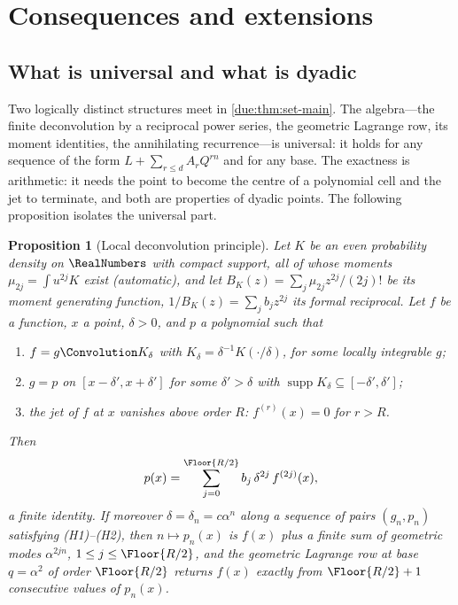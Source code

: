 \documentclass[11pt,oneside]{article}
\theoremstyle{plain}
\newtheorem{proposition}[theorem]{Proposition}
\theoremstyle{definition}
\theoremstyle{remark}
\newcommand{\Qq}{Q}                                         %
\begin{document}
\section{Consequences and extensions}
\label{due:sec:consequences}

\subsection{What is universal and what is dyadic}
\label{due:sec:cons-universal}

Two logically distinct structures meet in \cref{due:thm:set-main}.  The
algebra---the finite deconvolution by a reciprocal power series, the
geometric Lagrange row, its moment identities, the annihilating
recurrence---is universal: it holds for any sequence of the form
$L+\sum_{r\le d}A_{r}\Qq^{rn}$ and for any base.  The exactness is
arithmetic: it needs the point to become the centre of a polynomial cell
and the jet to terminate, and both are properties of dyadic points.  The
following proposition isolates the universal part.

\begin{proposition}[Local deconvolution principle]
\label{due:prop:cons-principle}
Let $K$ be an even probability density on $\RealNumbers$ with compact
support, all of whose moments $\mu_{2j}=\int u^{2j}K$ exist (automatic),
and let $B_{K}(z)=\sum_{j}\mu_{2j}z^{2j}/(2j)!$ be its moment generating
function, $1/B_{K}(z)=\sum_{j}b_{j}z^{2j}$ its formal reciprocal.  Let
$f$ be a function, $x$ a point, $\delta>0$, and $p$ a polynomial such that
\begin{enumerate}[label=\textup{(H\arabic*)}]
\item $f=g\Convolution K_{\delta}$ with $K_{\delta}=\delta^{-1}K(\cdot/\delta)$,
 for some locally integrable $g$;
\item $g=p$ on $[x-\delta',x+\delta']$ for some $\delta'>\delta$ with
 $\operatorname{supp}K_{\delta}\subseteq[-\delta',\delta']$;
\item the jet of $f$ at $x$ vanishes above order $R$: $f^{(r)}(x)=0$ for
 $r>R$.
\end{enumerate}
Then
\begin{equation}
 p(x)=\sum_{j=0}^{\Floor{R/2}}b_{j}\,\delta^{2j}\,f^{(2j)}(x),
 \label{due:eq:cons-principle}
\end{equation}
a finite identity.  If moreover $\delta=\delta_{n}=c\alpha^{n}$ along a
sequence of pairs $(g_{n},p_{n})$ satisfying (H1)--(H2), then
$n\mapsto p_{n}(x)$ is $f(x)$ plus a finite sum of geometric modes
$\alpha^{2jn}$, $1\le j\le\Floor{R/2}$, and the geometric Lagrange row at
base $q=\alpha^{2}$ of order $\Floor{R/2}$ returns $f(x)$ exactly from
$\Floor{R/2}+1$ consecutive values of $p_{n}(x)$.
\end{proposition}
\end{document}
